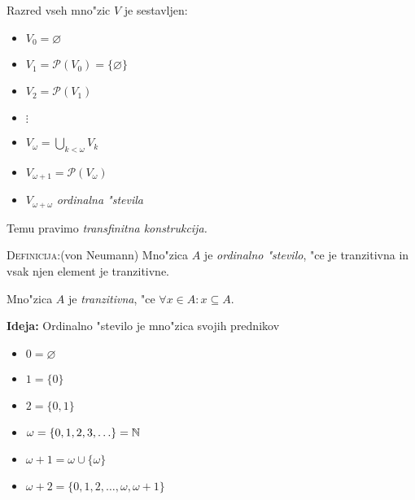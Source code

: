 Razred vseh mno"zic $V$ je sestavljen:
\begin{itemize}
	\item $V_0 = \varnothing$
	\item $V_1 = \mathcal{P}(V_0) = \{\varnothing\}$
	\item $V_2 = \mathcal{P}(V_1)$
	\item $\vdots$
	\item $V_\omega = \bigcup_{k < \omega}V_k$
	\item $V_{\omega + 1} = \mathcal{P}(V_\omega)$
	\item $V_{\omega + \omega}$ \emph{ordinalna "stevila}
\end{itemize}
Temu pravimo \emph{transfinitna konstrukcija.}

\textsc{Definicija:}(von Neumann) Mno"zica $A$ je \emph{ordinalno "stevilo}, "ce je tranzitivna in vsak njen element je tranzitivne.

Mno"zica $A$ je \emph{tranzitivna}, "ce $\forall x \in A: x \subseteq A$.

\textbf{Ideja:} Ordinalno "stevilo je mno"zica svojih prednikov
\begin{itemize}
	\item $0 = \varnothing$
	\item $1 = \{0\}$
	\item $2 = \{0, 1\}$
	\item $\omega = \{0, 1, 2, 3, \ldots\} = \mathbb{N}$
	\item $\omega + 1 = \omega \cup \{\omega\}$
	\item $\omega + 2 = \{0, 1, 2, \ldots, \omega, \omega + 1\}$
\end{itemize}
%
